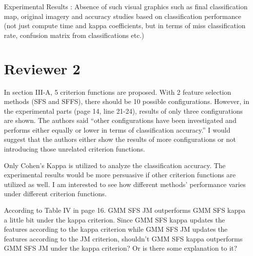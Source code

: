 \documentclass[a4paper,10pt,DIV=16]{scrartcl}
\begin{document}
\begin{revbox}
  Experimental Results : Absence of such visual graphics such as final
  classification map,  original imagery and accuracy  studies based on
  classification  performance   (not  just  compute  time   and  kappa
  coefficients, but  in terms  of miss classification  rate, confusion
  matrix from classifications etc.)

  \begin{resbox}

  \end{resbox}
\end{revbox}

\clearpage

\section{Reviewer 2}
\begin{revbox}
  In section III-A, 5 criterion functions are proposed. With 2 feature selection methods (SFS and SFFS), there should be 10 possible configurations. However, in the experimental parts (page 14, line 21-24), results of only three configurations are shown. The authors said “other configurations have been investigated and performs either equally or lower in terms of classification accuracy.” I would suggest that the authors either show the results of more configurations or not introducing those unrelated criterion functions.
  \begin{resbox}

  \end{resbox}
\end{revbox}

\begin{revbox}
  Only Cohen’s Kappa is utilized to analyze the classification accuracy. The experimental results would be more persuasive if other criterion functions are utilized as well. I am interested to see how different methods’ performance varies under different criterion functions.
  \begin{resbox}

  \end{resbox}
\end{revbox}

\begin{revbox}
  According to Table IV in page 16. GMM SFS JM outperforms GMM SFS kappa a little bit under the kappa criterion. Since GMM SFS kappa updates the features according to the kappa criterion while GMM SFS JM updates the features according to the JM criterion, shouldn’t GMM SFS kappa outperforms GMM SFS JM under the kappa criterion? Or is there some explanation to it?
  \begin{resbox}

  \end{resbox}
\end{revbox}
\end{document}
